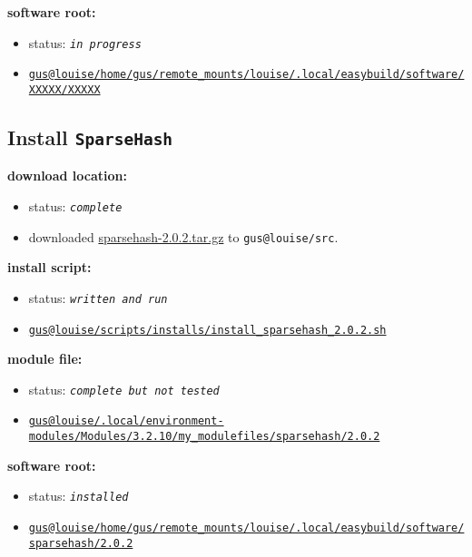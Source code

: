\documentclass[letterpaper]{scrartcl}
\begin{document}
\textbf{software root:}

\begin{itemize}
\item
  status: \emph{\texttt{in progress}}
\item
  \href{/home/gus/remote_mounts/louise/.local/easybuild/software/XXXXX/XXXXX}{\texttt{gus@louise/home/gus/remote\_mounts/louise/.local/easybuild/software/XXXXX/XXXXX}}
\end{itemize}

\subsection{Install \texttt{SparseHash}}\label{install-sparsehash}

\textbf{download location:}

\begin{itemize}
\item
  status: \emph{\texttt{complete}}
\item
  downloaded
  \href{https://sparsehash.googlecode.com/files/sparsehash-2.0.2.tar.gz}{sparsehash-2.0.2.tar.gz}
  to \texttt{gus@louise/src}.
\end{itemize}

\textbf{install script:}

\begin{itemize}
\item
  status: \emph{\texttt{written and run}}
\item
  \href{file:///home/gus/remote_mounts/louise/scripts/installs/install_sparsehash_2.0.2.sh}{\texttt{gus@louise/scripts/installs/install\_sparsehash\_2.0.2.sh}}
\end{itemize}

\textbf{module file:}

\begin{itemize}
\item
  status: \emph{\texttt{complete but not tested}}
\item
  \href{/home/gus/remote_mounts/louise/.local/environment-modules/Modules/3.2.10/my_modulefiles/sparsehash/2.0.2}{\texttt{gus@louise/.local/environment-modules/Modules/3.2.10/my\_modulefiles/sparsehash/2.0.2}}
\end{itemize}

\textbf{software root:}

\begin{itemize}
\item
  status: \emph{\texttt{installed}}
\item
  \href{/home/gus/remote_mounts/louise/.local/easybuild/software/sparsehash/2.0.2}{\texttt{gus@louise/home/gus/remote\_mounts/louise/.local/easybuild/software/sparsehash/2.0.2}}
\end{itemize}
\end{document}
